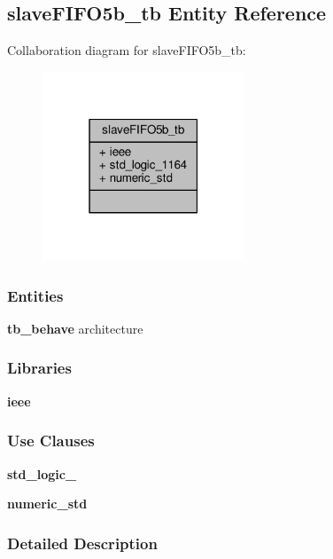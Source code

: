 \subsection{slave\+F\+I\+F\+O5b\+\_\+tb Entity Reference}
\label{classslaveFIFO5b__tb}


Collaboration diagram for slave\+F\+I\+F\+O5b\+\_\+tb\+:\nopagebreak
\begin{figure}[H]
\begin{center}
\leavevmode
\includegraphics[width=171pt]{d1/dea/classslaveFIFO5b__tb__coll__graph}
\end{center}
\end{figure}
\subsubsection*{Entities}
\begin{DoxyCompactItemize}
\item 
{\bf tb\+\_\+behave} architecture
\end{DoxyCompactItemize}
\subsubsection*{Libraries}
 \begin{DoxyCompactItemize}
\item 
{\bf ieee} 
\end{DoxyCompactItemize}
\subsubsection*{Use Clauses}
 \begin{DoxyCompactItemize}
\item 
{\bf std\+\_\+logic\+\_}   
\item 
{\bf numeric\+\_\+std}   
\end{DoxyCompactItemize}


\subsubsection{Detailed Description}


